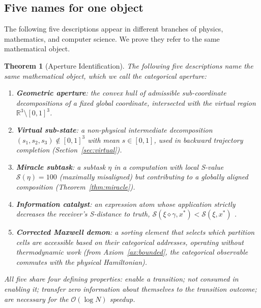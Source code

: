 \documentclass[twocolumn,10pt,a4paper]{article}
\theoremstyle{thmstyle}
\newtheorem{theorem}{Theorem}[section]
\theoremstyle{definition}
\theoremstyle{remark}
\newcommand{\R}{\mathbb{R}}
\begin{document}
\subsection{Five names for one object}

The following five descriptions appear in different branches of physics,
mathematics, and computer science. We prove they refer to the same
mathematical object.

\begin{theorem}[Aperture Identification]
\label{thm:aperture_id}
The following five descriptions name the same mathematical object,
which we call the \emph{categorical aperture}:

\begin{enumerate}[nosep,label=(\arabic*)]
\item \textbf{Geometric aperture}: the convex hull of admissible sub-coordinate
decompositions of a fixed global coordinate, intersected with the virtual
region $\R^3 \setminus [0,1]^3$.

\item \textbf{Virtual sub-state}: a non-physical intermediate decomposition
$(s_1, s_2, s_3) \notin [0,1]^3$ with mean $s \in [0,1]$, used in
backward trajectory completion (Section~\ref{sec:virtual}).

\item \textbf{Miracle subtask}: a subtask $\eta$ in a computation with
local S-value $\mathcal{S}(\eta) = 100$ (maximally misaligned) but
contributing to a globally aligned composition
(Theorem~\ref{thm:miracle}).

\item \textbf{Information catalyst}: an expression atom whose application
strictly decreases the receiver's S-distance to truth,
$\mathcal{S}(\xi \diamond \gamma, x^*) < \mathcal{S}(\xi, x^*)$
\citep{companion:recursion}.

\item \textbf{Corrected Maxwell demon}: a sorting element that selects
which partition cells are accessible based on their categorical addresses,
operating without thermodynamic work (from Axiom~\ref{ax:bounded},
the categorical observable commutes with the physical Hamiltonian).
\end{enumerate}

All five share four defining properties:
enable a transition; not consumed in enabling it; transfer zero information
about themselves to the transition outcome; are necessary for the
$\mathcal{O}(\log N)$ speedup.
\end{theorem}
\end{document}
